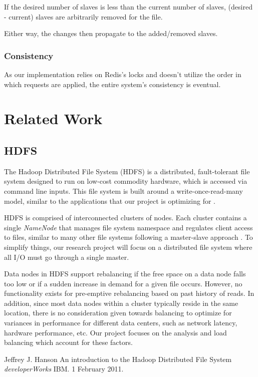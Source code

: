 \documentclass{article}
\begin{document}
If the desired number of slaves is less than the current number of slaves, (desired - current) slaves are arbitrarily removed for the file. 

Either way, the changes then propagate to the added/removed slaves. 

\subsubsection{Consistency}

As our implementation relies on Redis's locks and doesn't utilize the order in which requests are applied, the entire system's consistency is eventual. 


\section{Related Work}
\subsection{HDFS}
The Hadoop Distributed File System (HDFS) is a distributed, fault-tolerant file system designed to run on low-cost commodity hardware, which is accessed via command line inputs. This file system is built around a write-once-read-many model, similar to the applications that our project is optimizing for \cite{HDFS}.

HDFS is comprised of interconnected clusters of nodes. Each cluster contains a single \emph{NameNode} that manages file system namespace and regulates client access to files, similar to many other file systems following a master-slave approach \cite{HDFS}. To simplify things, our research project will focus on a distributed file system where all I/O must go through a single master. 

Data nodes in HDFS support rebalancing if the free space on a data node falls too low or if a sudden increase in demand for a given file occurs. However, no functionality exists for pre-emptive rebalancing based on past history of reads. In addition, since most data nodes within a cluster typically reside in the same location, there is no consideration given towards balancing to optimize for variances in performance for different data centers, such as network latency, hardware performance, etc. Our project focuses on the analysis and load balancing which account for these factors. 

\newpage
\begin{thebibliography}{10}

 Jeffrey J. Hanson
\newblock An introduction to the Hadoop Distributed File System
\newblock \textit{developerWorks}
\newblock IBM. 1 February 2011. 

\end{thebibliography}
\end{document}
